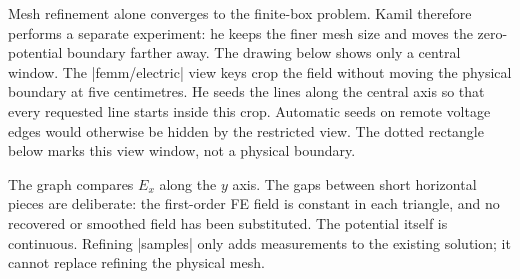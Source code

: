 \begin{codeexample}[width=0pt]
\end{codeexample}

Mesh refinement alone converges to the finite-box problem. Kamil therefore
performs a separate experiment: he keeps the finer mesh size and moves the
zero-potential boundary farther away. The drawing below shows only a central
window. The |femm/electric| view keys crop the field without moving the
physical boundary at five centimetres. He seeds the lines along the central
axis so that every requested line starts inside this crop. Automatic seeds on
remote voltage edges would otherwise be hidden by the restricted view.
The dotted rectangle below marks this view window, not a physical boundary.

\begin{codeexample}[width=0pt]
\end{codeexample}

The graph compares $E_x$ along the $y$ axis. The gaps between short horizontal
pieces are deliberate: the first-order FE field is constant in each triangle,
and no recovered or smoothed field has been substituted. The potential itself
is continuous. Refining |samples| only adds measurements to the existing
solution; it cannot replace refining the physical mesh.

